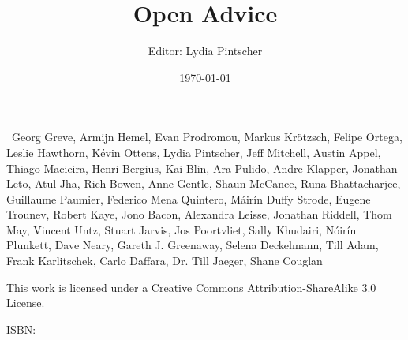 \documentclass[a5paper,DIV=12,BCOR=9mm,headsepline,headings=normal,cleardoubleempty,10pt]{scrbook}
\title{Open Advice}
\author{Editor: Lydia Pintscher}
\date{\today}
\begin{document}
\frontmatter
\maketitle
\newpage
\vspace*{\fill}
\textcopyright\ Georg Greve, Armijn Hemel, Evan Prodromou, Markus Krötzsch, Felipe Ortega, Leslie Hawthorn, Kévin Ottens, Lydia Pintscher, Jeff Mitchell, Austin Appel, Thiago Macieira, Henri Bergius, Kai Blin, Ara Pulido, Andre Klapper, Jonathan Leto, Atul Jha, Rich Bowen, Anne Gentle, Shaun McCance, Runa Bhattacharjee, Guillaume Paumier, Federico Mena Quintero, Máirín Duffy Strode, Eugene Trounev, Robert Kaye, Jono Bacon, Alexandra Leisse, Jonathan Riddell, Thom May, Vincent Untz, Stuart Jarvis, Jos Poortvliet, Sally Khudairi, Nóirín Plunkett, Dave Neary, Gareth J. Greenaway, Selena Deckelmann, Till Adam, Frank Karlitschek, Carlo Daffara, Dr. Till Jaeger, Shane Couglan

\cc \bysa This work is licensed under a Creative Commons Attribution-ShareAlike 3.0 License.

ISBN: 


\tableofcontents*
\listoftodos
\mainmatter





%












\backmatter
\end{document}

